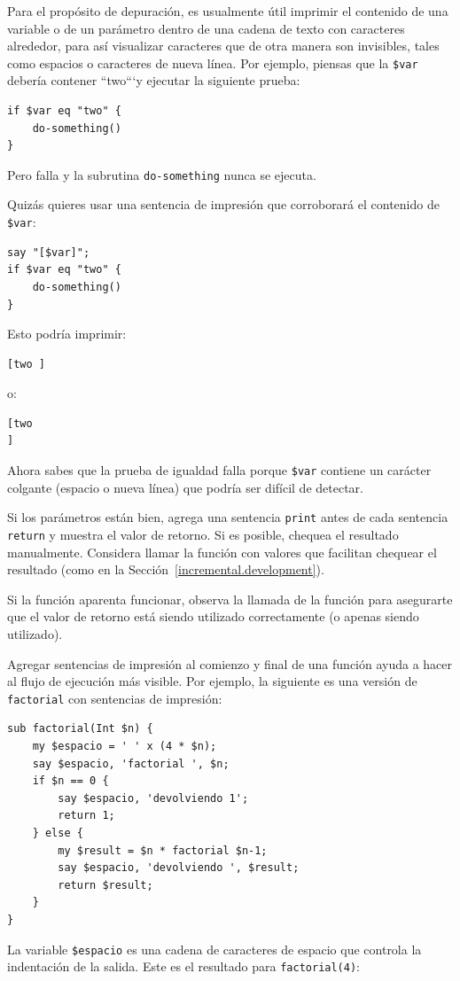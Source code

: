Para el propósito de depuración, es usualmente útil imprimir
el contenido de una variable o de un parámetro dentro de 
una cadena de texto con caracteres alrededor, para así 
visualizar caracteres que de otra manera son invisibles, tales
como espacios o caracteres de nueva línea. Por ejemplo, piensas
que la \verb|$var| debería contener ``two```y ejecutar la 
siguiente prueba:
\begin{lstlisting}
if $var eq "two" {
    do-something()
}
\end{lstlisting}
%
Pero falla y la subrutina {\tt do-something} nunca se ejecuta.

Quizás quieres usar una sentencia de impresión que 
corroborará el contenido de \verb|$var|:
\begin{lstlisting}
say "[$var]";
if $var eq "two" {
    do-something()
}
\end{lstlisting}
%

Esto podría imprimir:
\begin{lstlisting}
[two ]
\end{lstlisting}
%

o:
\begin{lstlisting}
[two
]
\end{lstlisting}
%
Ahora sabes que la prueba de igualdad falla porque 
\verb|$var| contiene un carácter colgante (espacio o nueva línea)
que podría ser difícil de detectar.

Si los parámetros están bien, agrega una sentencia {\tt print}
antes de cada sentencia {\tt return} y muestra el valor de retorno.
Si es posible, chequea el resultado manualmente. Considera llamar 
la función con valores que facilitan chequear el resultado
(como en la Sección~\ref{incremental.development}).

Si la función aparenta funcionar, observa la llamada de la función
para asegurarte que el valor de retorno está siendo utilizado 
correctamente (o apenas siendo utilizado).

Agregar sentencias de impresión al comienzo y final de una función
ayuda a hacer al flujo de ejecución más visible. 
Por ejemplo, la siguiente es una versión de {\tt factorial}
con sentencias de impresión:

\begin{lstlisting}
sub factorial(Int $n) {
    my $espacio = ' ' x (4 * $n);
    say $espacio, 'factorial ', $n;
    if $n == 0 {
        say $espacio, 'devolviendo 1';
        return 1;
    } else {
        my $result = $n * factorial $n-1;
        say $espacio, 'devolviendo ', $result;
        return $result;
    }
}
\end{lstlisting}
%
La variable {\tt \$espacio} es una cadena de caracteres de espacio que 
controla la indentación de la salida. Este es el resultado para 
{\tt factorial(4)}:

